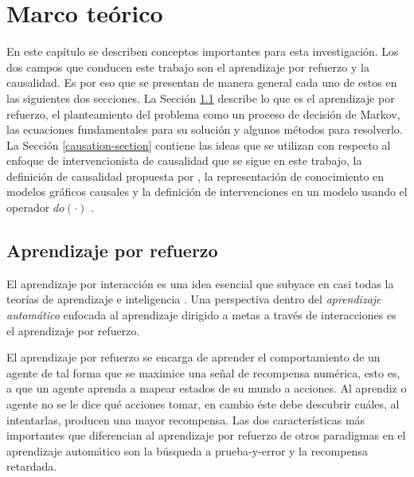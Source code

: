 
\chapter{Marco teórico}\label{chapter2}

\graphicspath{{Chapter2/Figs/}}

En este capítulo se describen conceptos importantes para esta investigación.
Los dos campos que conducen este trabajo son
el aprendizaje por refuerzo y la causalidad.
Es por eso que se presentan de manera general cada uno
de estos en las siguientes dos
secciones.
La Sección \ref{rl-section} describe lo que es el aprendizaje
por refuerzo, el planteamiento del problema
como un proceso de decisión de Markov, las ecuaciones
fundamentales para su solución y algunos métodos para
resolverlo.
La Sección \ref{causation-section} contiene las ideas que se utilizan
con respecto al enfoque de intervencionista de causalidad que se sigue en este trabajo, la definición de causalidad propuesta
por \cite{spirtes2000causation}, la 
representación de conocimiento en modelos gráficos 
causales y la definición de intervenciones en un modelo usando el operador $do(\cdot)$ \cite{pearl_2009}.

\section{Aprendizaje por refuerzo}\label{rl-section}

El aprendizaje por interacción es una idea esencial que subyace en casi todas la teorías
de aprendizaje e inteligencia \cite{sutton_barto_2018}.
Una perspectiva dentro del \textit{aprendizaje automático} \cite{Goodfellow-et-al-2016} enfocada al aprendizaje dirigido a metas a través de interacciones es el aprendizaje por refuerzo.

El aprendizaje por refuerzo se encarga de aprender el comportamiento de un agente 
de tal forma que se maximice una señal de recompensa numérica, esto es, a que un
agente aprenda a mapear estados de su mundo a acciones. Al aprendiz o agente no se le 
dice qué acciones tomar, en cambio éste debe descubrir cuáles, al intentarlas, producen
una mayor recompensa. Las dos características más importantes que diferencian al
aprendizaje por refuerzo de otros paradigmas en el aprendizaje automático son 
la búsqueda a prueba-y-error y la recompensa retardada.

